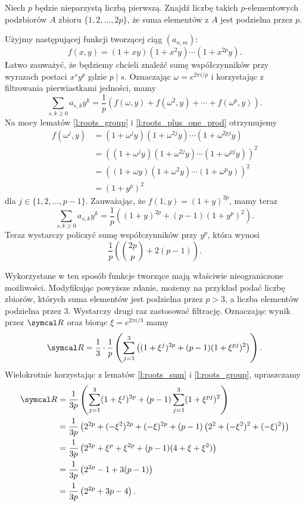 \documentclass[bibliography=totocnumbered]{scrartcl}
\begin{document}
    \begin{example}[IMO 1995/6]
        Niech $p$ będzie nieparzystą liczbą pierwszą. Znajdź liczbę takich $p$-elementowych podzbiorów $A$ zbioru $\{1,2,\ldots,2p\}$, że suma elementów z $A$ jest podzielna przez $p$.
    \end{example}
    \begin{solution}
        Użyjmy następującej funkcji tworzącej ciąg $(a_{n,m})$:
        $$ f(x, y) = (1 + xy)(1 + x^2y)\cdots(1 + x^{2p}y). $$
        Łatwo zauważyć, że będziemy chcieli znaleźć sumę współczynników przy wyrazach postaci $x^s y^p$ gdzie $p\mid s$. Oznaczając $\omega = e^{2\pi i / p}$ i korzystając z filtrowania pierwiastkami jedności, mamy
        $$ \sum_{s,k\geq 0} a_{s,k}y^k = \frac{1}{p}\left(f(\omega, y) + f(\omega^2, y) + \cdots + f(\omega^p, y)\right). $$
        Na mocy lematów \ref{l:roots_group} i \ref{l:roots_plus_one_prod} otrzymujemy
        \begin{align*}
            f(\omega^j, y) &= (1 + \omega^j y)(1 + \omega^{2j}y)\cdots(1 + \omega^{2pj}y) \\
                           &= \left((1 + \omega^j y)(1 + \omega^{2j}y)\cdots(1 + \omega^{pj}y)\right)^2 \\
                           &= \left((1 + \omega y)(1 + \omega^2 y)\cdots(1 + \omega^p y)\right)^2 \\
                           &= (1 + y^p)^2
        \end{align*}
        dla $j \in\{1, 2, \ldots, p-1\}$. Zauważając, że $f(1, y) = (1 + y)^{2p}$, mamy teraz
        $$ \sum_{s,k\geq 0} a_{s,k}y^k = \frac{1}{p}\left((1 + y)^{2p} + (p - 1)(1 + y^p)^2\right). $$
        Teraz wystarczy policzyć sumę współczynników przy $y^p$, która wynosi
        $$ \frac{1}{p}\left(\binom{2p}{p} + 2(p - 1)\right). $$
    \end{solution}

    Wykorzystane w ten sposób funkcje tworzące mają właściwie nieograniczone możliwości. Modyfikując powyższe zdanie, możemy na przykład podać liczbę zbiorów, których suma elementów jest podzielna przez $p > 3$, a liczba elementów podzielna przez $3$. Wystarczy drugi raz zastosować filtrację. Oznaczając wynik przez $\sR$ oraz biorąc $\xi = e^{2\pi i / 3}$ mamy
    $$ \sR = \frac{1}{3}\cdot\frac{1}{p}\left(\sum_{j = 1}^3\left((1 + \xi^j)^{2p} + (p - 1)(1 + \xi^{pj})^2\right)\right). $$
    Wielokrotnie korzystając z lematów \ref{l:roots_sum} i \ref{l:roots_group}, upraszczamy
    \begin{align*}
        \sR &= \frac{1}{3p}\left(\sum_{j = 1}^3 (1 + \xi^j)^{2p} + (p - 1)\sum_{j = 1}^3 (1 + \xi^{pj})^2\right) \\
          &= \frac{1}{3p}\left(2^{2p} + (-\xi^2)^{2p} + (-\xi)^{2p} + (p - 1)\left(2^2 + (-\xi^2)^2 + (-\xi)^2\right)\right) \\
          &= \frac{1}{3p}\left(2^{2p} + \xi^p + \xi^{2p} + (p - 1)(4 + \xi + \xi^2)\right) \\
          &= \frac{1}{3p}\left(2^{2p} - 1 + 3(p - 1)\right) \\
          &= \frac{1}{3p}\left(2^{2p} + 3p - 4\right).
    \end{align*}
\end{document}

